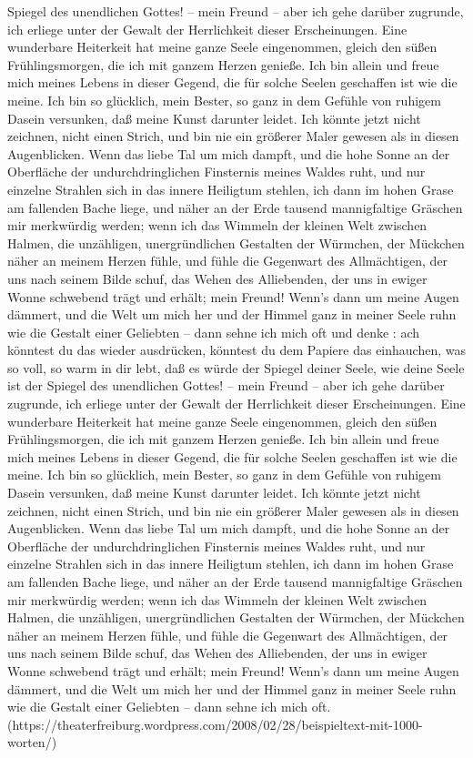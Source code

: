 \documentclass{scrreprt}
\begin{document}
Spiegel des unendlichen Gottes! – mein Freund – aber ich gehe darüber zugrunde, ich erliege unter der Gewalt der Herrlichkeit dieser Erscheinungen. Eine wunderbare Heiterkeit hat meine ganze Seele eingenommen, gleich den süßen Frühlingsmorgen, die ich mit ganzem Herzen genieße. Ich bin allein und freue mich meines Lebens in dieser Gegend, die für solche Seelen geschaffen ist wie die meine. Ich bin so glücklich, mein Bester, so ganz in dem Gefühle von ruhigem Dasein versunken, daß meine Kunst darunter leidet. Ich könnte jetzt nicht zeichnen, nicht einen Strich, und bin nie ein größerer Maler gewesen als in diesen Augenblicken. Wenn das liebe Tal um mich dampft, und die hohe Sonne an der Oberfläche der undurchdringlichen Finsternis meines Waldes ruht, und nur einzelne Strahlen sich in das innere Heiligtum stehlen, ich dann im hohen Grase am fallenden Bache liege, und näher an der Erde tausend mannigfaltige Gräschen mir merkwürdig werden; wenn ich das Wimmeln der kleinen Welt zwischen Halmen, die unzähligen, unergründlichen Gestalten der Würmchen, der Mückchen näher an meinem Herzen fühle, und fühle die Gegenwart des Allmächtigen, der uns nach seinem Bilde schuf, das Wehen des Alliebenden, der uns in ewiger Wonne schwebend trägt und erhält; mein Freund! Wenn’s dann um meine Augen dämmert, und die Welt um mich her und der Himmel ganz in meiner Seele ruhn wie die Gestalt einer Geliebten – dann sehne ich mich oft und denke : ach könntest du das wieder ausdrücken, könntest du dem Papiere das einhauchen, was so voll, so warm in dir lebt, daß es würde der Spiegel deiner Seele, wie deine Seele ist der Spiegel des unendlichen Gottes! – mein Freund – aber ich gehe darüber zugrunde, ich erliege unter der Gewalt der Herrlichkeit dieser Erscheinungen. Eine wunderbare Heiterkeit hat meine ganze Seele eingenommen, gleich den süßen Frühlingsmorgen, die ich mit ganzem Herzen genieße. Ich bin allein und freue mich meines Lebens in dieser Gegend, die für solche Seelen geschaffen ist wie die meine. Ich bin so glücklich, mein Bester, so ganz in dem Gefühle von ruhigem Dasein versunken, daß meine Kunst darunter leidet. Ich könnte jetzt nicht zeichnen, nicht einen Strich, und bin nie ein größerer Maler gewesen als in diesen Augenblicken. Wenn das liebe Tal um mich dampft, und die hohe Sonne an der Oberfläche der undurchdringlichen Finsternis meines Waldes ruht, und nur einzelne Strahlen sich in das innere Heiligtum stehlen, ich dann im hohen Grase am fallenden Bache liege, und näher an der Erde tausend mannigfaltige Gräschen mir merkwürdig werden; wenn ich das Wimmeln der kleinen Welt zwischen Halmen, die unzähligen, unergründlichen Gestalten der Würmchen, der Mückchen näher an meinem Herzen fühle, und fühle die Gegenwart des Allmächtigen, der uns nach seinem Bilde schuf, das Wehen des Alliebenden, der uns in ewiger Wonne schwebend trägt und erhält; mein Freund! Wenn’s dann um meine Augen dämmert, und die Welt um mich her und der Himmel ganz in meiner Seele ruhn wie die Gestalt einer Geliebten – dann sehne ich mich oft. (https://theaterfreiburg.wordpress.com/2008/02/28/beispieltext-mit-1000-worten/)
	
\end{document}
